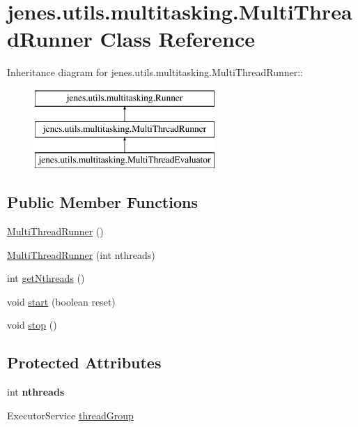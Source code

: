 \hypertarget{classjenes_1_1utils_1_1multitasking_1_1_multi_thread_runner}{
\section{jenes.utils.multitasking.MultiThreadRunner Class Reference}
\label{classjenes_1_1utils_1_1multitasking_1_1_multi_thread_runner}
}
Inheritance diagram for jenes.utils.multitasking.MultiThreadRunner::\begin{figure}[H]
\begin{center}
\leavevmode
\includegraphics[height=3cm]{classjenes_1_1utils_1_1multitasking_1_1_multi_thread_runner}
\end{center}
\end{figure}
\subsection*{Public Member Functions}
\begin{CompactItemize}
\item 
\hyperlink{classjenes_1_1utils_1_1multitasking_1_1_multi_thread_runner_b0815486f3159f086cd06ccab94df319}{MultiThreadRunner} ()
\item 
\hyperlink{classjenes_1_1utils_1_1multitasking_1_1_multi_thread_runner_6319362b08c06d8bf26989407d223c31}{MultiThreadRunner} (int nthreads)
\item 
int \hyperlink{classjenes_1_1utils_1_1multitasking_1_1_multi_thread_runner_69370630a898026070fe8e806cec8fe0}{getNthreads} ()
\item 
void \hyperlink{classjenes_1_1utils_1_1multitasking_1_1_multi_thread_runner_52fc59a28c3187e84b871b9b823b7f43}{start} (boolean reset)
\item 
void \hyperlink{classjenes_1_1utils_1_1multitasking_1_1_multi_thread_runner_5f00a9b63ff1322d586ad62ec060d597}{stop} ()
\end{CompactItemize}
\subsection*{Protected Attributes}
\begin{CompactItemize}
\item 
\hypertarget{classjenes_1_1utils_1_1multitasking_1_1_multi_thread_runner_a20fe700a6b2abd3694b4a1d5629db8f}{
int \textbf{nthreads}}
\label{classjenes_1_1utils_1_1multitasking_1_1_multi_thread_runner_a20fe700a6b2abd3694b4a1d5629db8f}

\item 
ExecutorService \hyperlink{classjenes_1_1utils_1_1multitasking_1_1_multi_thread_runner_fd9939cc7a261bd4bb6c8f3de6f58337}{threadGroup}
\end{CompactItemize}


